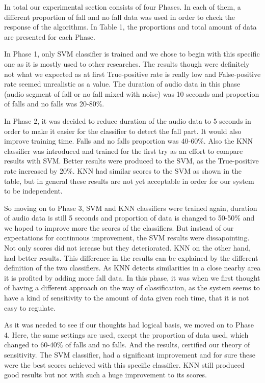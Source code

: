 \documentclass[10pt, conference, compsocconf]{IEEEtran}
\begin{document}
In total our experimental section consists of four Phases. In each of them, a different proportion of fall and no fall data was used in order to check the response of the algorithms. In Table 1, the proportions and total amount of data are presented for each Phase. 

In Phase 1, only SVM classifier is trained and we chose to begin with this specific one as it is mostly used to other researches. The results though were definitely not what we expected as at first True-positive rate is really low and False-positive rate seemed unrealistic as a value. The duration of audio data in this phase (audio segment of fall or no fall mixed with noise) was 10 seconds and proportion of falls and no falls was 20-80\%. 

In Phase 2, it was decided to reduce duration of the audio data to 5 seconds in order to make it easier for the classifier to detect the fall part. It would also improve training time. Falls and no falls proportion was 40-60\%. Also the KNN classifier was introduced and trained for the first try as an effort to compare results with SVM. Better results were produced to the SVM, as the True-positive rate increased by 20\%. KNN had similar scores to the SVM as shown in the table, but in general these results are not yet acceptable in order for our system to be independent. 

So moving on to Phase 3, SVM and KNN classifiers were trained again, duration of audio data is still 5 seconds and proportion of data is changed to 50-50\% and we hoped to improve more the scores of the classifiers. But instead of our expectations for continuous improvement, the SVM results were dissapointing. Not only scores did not icrease but they deteriorated. KNN on the other hand, had better results. This difference in the results can be explained by the different definition of the two classifiers. As KNN detects similarities in a close nearby area it is profited by adding more fall data. In this phase, it was when we first thought of having a different approach on the way of classification, as the system seems to have a kind of sensitivity to the amount of data given each time, that it is not easy to regulate. 

As it was needed to see if our thoughts had logical basis, we moved on to Phase 4. Here, the same settings are used, except the proportion of data used, which changed to 60-40\% of falls and no falls. And the results, certified our theory of sensitivity. The SVM classifier, had a significant improvement and for sure these were the best scores achieved with this specific classifier. KNN still produced good results but not with such a huge improvement to its scores. 
\end{document}

